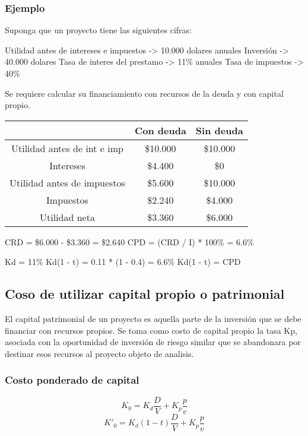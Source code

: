 \documentclass[a4paper, 11pt, oneside]{article}
\begin{document}
\subsubsection{Ejemplo}

Suponga que un proyecto tiene las siguientes cifras:

Utilidad antes de intereses e impuestos -> 10.000 dolares anuales
Inversión -> 40.000 dolares
Tasa de interes del prestamo -> 11\% anuales
Tasa de impuestos -> 40\%

Se requiere calcular su financiamiento con recursos de la deuda y con capital propio.

\begin{table}
\begin{tabular}{ |c|c|c| }
\hline
                                &   Con deuda          &           Sin deuda \\
\hline
Utilidad antes de int e imp     &  \$10.000            &           \$10.000\\
Intereses		 	&   \$4.400            &                \$0\\
Utilidad antes de impuestos     &   \$5.600            &           \$10.000\\
Impuestos			&   \$2.240            &            \$4.000\\
Utilidad neta			&   \$3.360            &            \$6.000\\
\hline
\end{tabular}
\end{table}

CRD = \$6.000 - \$3.360 = \$2.640
CPD = (CRD / I) * 100\% = 6.6\%

Kd = 11\%
Kd(1 - t) = 0.11 * (1 - 0.4) = 6.6\%
Kd(1 - t) = CPD

\subsection{Coso de utilizar capital propio o patrimonial}

El capital patrimonial de un proyecto es aquella parte de la inversión que se debe financiar con recursos propios. Se toma como costo de capital propio
la tasa Kp, asociada con la oportunidad de inversión de riesgo similar que se abandonara por destinar esos recursos al proyecto objeto de analisis.

\subsubsection{Costo ponderado de capital}
\[ K_0 = K_d\frac{D}{V}+K_p\frac{p}{v} \]
\[ K'_0 = K_d(1-t)\frac{D}{V}+K_p\frac{p}{v} \]
\end{document}
